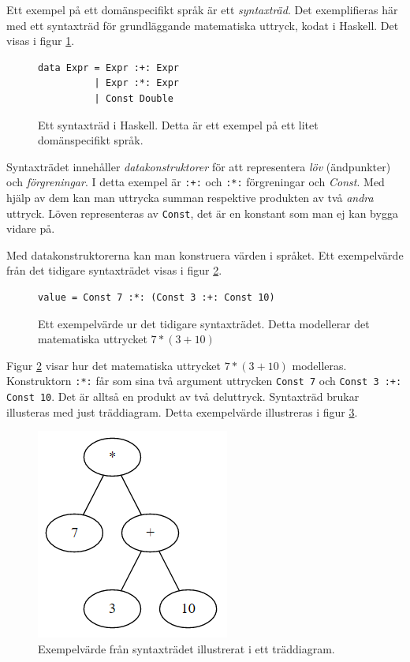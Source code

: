 \begin{draft}
Ett exempel på ett domänspecifikt språk är ett \textit{syntaxträd}. Det exemplifieras här med ett syntaxträd för grundläggande matematiska uttryck, kodat i Haskell. Det visas i figur \ref{fig:syntax_exempel}.

\begin{figure}[tph]
  \begin{lstlisting}
data Expr = Expr :+: Expr
          | Expr :*: Expr
          | Const Double
  \end{lstlisting}
  \caption{Ett syntaxträd i Haskell. Detta är ett exempel på ett litet domänspecifikt språk.}
  \label{fig:syntax_exempel}
\end{figure}

Syntaxträdet innehåller \textit{datakonstruktorer} för att representera \textit{löv} (ändpunkter) och \textit{förgreningar}. I detta exempel är \texttt{:+:} och \texttt{:*:} förgreningar och \textit{Const}. Med hjälp av dem kan man uttrycka summan respektive produkten av två \textit{andra} uttryck. Löven representeras av \texttt{Const}, det är en konstant som man ej kan bygga vidare på.

Med datakonstruktorerna kan man konstruera värden i språket. Ett exempelvärde från det tidigare syntaxträdet visas i figur \ref{fig:syntax_exempel_varde}.

\begin{figure}[tph]
  \begin{lstlisting}
value = Const 7 :*: (Const 3 :+: Const 10)
  \end{lstlisting}
  \caption{Ett exempelvärde ur det tidigare syntaxträdet. Detta modellerar det matematiska uttrycket $7 * (3 + 10)$}
  \label{fig:syntax_exempel_varde}
\end{figure}

Figur \ref{fig:syntax_exempel_varde} visar hur det matematiska uttrycket $7 * (3 + 10)$ modelleras. Konstruktorn \texttt{:*:} får som sina två argument uttrycken \texttt{Const 7} och \texttt{Const 3 :+: Const 10}. Det är alltså en produkt av två deluttryck. Syntaxträd brukar illusteras med just träddiagram. Detta exempelvärde illustreras i figur \ref{fig:syntax_exempel_bild}.

\begin{figure}[tph]
  \centering
  \includegraphics[width=0.4\linewidth]{figure/syntax_exempel_bild.png}
  \caption{Exempelvärde från syntaxträdet illustrerat i ett träddiagram.}
  \label{fig:syntax_exempel_bild}
\end{figure}


\end{draft}
